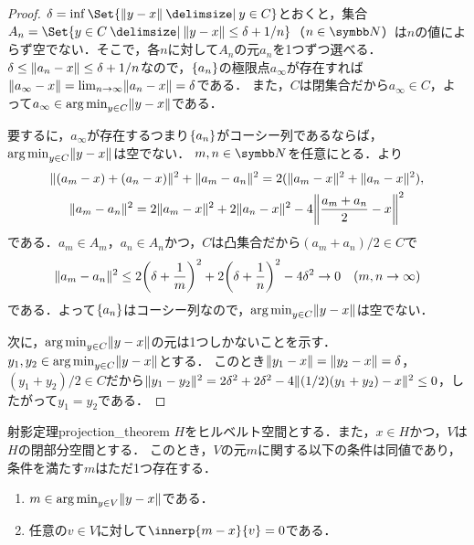 \documentclass[../../main]{subfiles}
\begin{document}
\begin{proof}
  \(\delta=\inf\Set{\vnorm{y-x}\given y\in C}\)とおくと，集合\(A_n=\Set{y\in C\given\vnorm{y-x}\leq\delta+1/n}\)（\(n\in\numset{N}\)）は\(n\)の値によらず空でない．そこで，各\(n\)に対して\(A_n\)の元\(a_n\)を1つずつ選べる．
  \(\delta\leq\lVert a_n-x\rVert\leq\delta+1/n\)なので，\(\lbrace a_n\rbrace\)の極限点\(a_\infty\)が存在すれば\(\lVert a_\infty-x\rVert=\lim_{n\to\infty}\lVert a_n-x\rVert=\delta\)である．
  また，\(C\)は閉集合だから\(a_\infty\in C\)，よって\(a_\infty\in\operatorname*{arg\,min}_{y\in C}\lVert y-x\rVert\)である．

  要するに，\(a_\infty\)が存在する\texttwoemdash つまり\(\lbrace a_n\rbrace\)がコーシー列である\texttwoemdash ならば，\(\operatorname*{arg\,min}_{y\in C}\lVert y-x\rVert\)は空でない．
  \(m,n\in\numset{N}\)を任意にとる．より
  \begin{gather*}
    \vnorm{(a_m-x)+(a_n-x)}^2+\vnorm{a_m-a_n}^2 = 2(\vnorm{a_m-x}^2+\vnorm{a_n-x}^2), \\
    \vnorm{a_m-a_n}^2 = 2\vnorm{a_m-x}^2+2\vnorm{a_n-x}^2-4\vnorm*{\frac{a_m+a_n}{2}-x}^2
  \end{gather*}
  である．\(a_m\in A_m\)，\(a_n\in A_n\)かつ，\(C\)は凸集合だから\((a_m+a_n)/2\in C\)で
  \[
    \vnorm{a_m-a_n}^2 \leq 2\pqty*{\delta+\frac{1}{m}}^2+2\pqty*{\delta+\frac{1}{n}}^2-4\delta^2
    \to 0\quad(m,n\to\infty)
  \]
  である．よって\(\lbrace a_n\rbrace\)はコーシー列なので，\(\operatorname*{arg\,min}_{y\in C}\lVert y-x\rVert\)は空でない．

  次に，\(\operatorname*{arg\,min}_{y\in C}\lVert y-x\rVert\)の元は1つしかないことを示す．\(y_1,y_2\in\operatorname*{arg\,min}_{y\in C}\lVert y-x\rVert\)とする．
  このとき\(\lVert y_1-x\rVert=\lVert y_2-x\rVert=\delta\)，\((y_1+y_2)/2\in C\)だから\(\lVert y_1-y_2\rVert^2=2\delta^2+2\delta^2-4\lVert(1/2)(y_1+y_2)-x\rVert^2\leq 0\)，したがって\(y_1=y_2\)である．
\end{proof}

\begin{theorem}{射影定理}{projection_theorem}
  \(H\)をヒルベルト空間とする．また，\(x\in H\)かつ，\(V\)は\(H\)の閉部分空間とする．
  このとき，\(V\)の元\(m\)に関する以下の条件は同値であり，条件を満たす\(m\)はただ1つ存在する．
  \begin{enumerate}
    \item \(m\in\operatorname*{arg\,min}_{y\in V}\lVert y-x\rVert\)である．
    \item 任意の\(v\in V\)に対して\(\innerp{m-x}{v}=0\)である．
  \end{enumerate}
\end{theorem}
\end{document}
